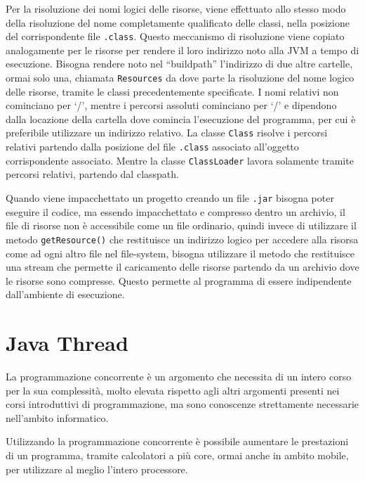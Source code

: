 \documentclass{article}
\numberwithin{equation}{subsection}
\begin{document}
Per la risoluzione dei nomi logici delle risorse, viene effettuato allo stesso modo della risoluzione del nome completamente qualificato delle classi, nella posizione del 
corrispondente file \verb|.class|. 
Questo meccanismo di risoluzione viene copiato analogamente per le risorse per rendere il loro indirizzo noto alla JVM a tempo di esecuzione. 
Bisogna rendere noto nel ``buildpath'' l'indirizzo di due altre cartelle, ormai solo una, chiamata \verb|Resources| da dove parte la risoluzione del nome logico delle risorse, 
tramite le classi precedentemente specificate. I nomi relativi non cominciano per `/', mentre i percorsi assoluti cominciano per `/' e dipendono dalla locazione della cartella 
dove comincia l'esecuzione del programma, per cui è preferibile utilizzare un indirizzo relativo. 
La classe \verb|Class| risolve i percorsi relativi partendo dalla posizione del file \verb|.class| associato all'oggetto corrispondente associato. 
Mentre la classe \verb|ClassLoader| lavora solamente tramite percorsi relativi, partendo dal classpath. 

Quando viene impacchettato un progetto creando un file \verb|.jar| bisogna poter eseguire il codice, ma essendo impacchettato e compresso dentro un archivio, il file di 
risorse non è accessibile come un file ordinario, quindi invece di utilizzare il metodo \verb|getResource()| che restituisce un indirizzo logico per accedere alla risorsa come 
ad ogni altro file nel file-system, bisogna utilizzare il metodo che restituisce una stream che permette il caricamento delle risorse partendo da un archivio dove le risorse sono 
compresse. 
Questo permette al programma di essere indipendente dall'ambiente di esecuzione. 

\clearpage

\section{Java Thread}

La programmazione concorrente è un argomento che necessita di un intero corso per la sua complessità, molto elevata rispetto agli altri argomenti presenti nei corsi 
introduttivi di programmazione, ma sono conoscenze strettamente necessarie nell'ambito informatico. 

Utilizzando la programmazione concorrente è possibile aumentare le prestazioni di un programma, tramite calcolatori a più core, ormai anche in ambito mobile, per utilizzare al 
meglio l'intero processore. 
\end{document}

